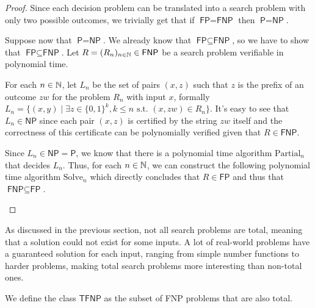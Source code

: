 \begin{proof}
 Since each decision problem can be translated into a search problem with only two possible outcomes, we trivially get that if $\textsf{FP} = \textsf{FNP}$ then $\textsf{P} = \textsf{NP}$.
    
 Suppose now that $\textsf{P} = \textsf{NP}$. We already know that $\textsf{FP} \subseteq \textsf{FNP}$, so we have to show that $\textsf{FP} \subseteq \textsf{FNP}$. Let $R = (R_n)_{n \in \mathbb{N}} \in \textsf{FNP}$ be a search problem verifiable in polynomial time.
    
 For each $n \in \mathbb{N}$, let $L_n$ be the set of pairs $(x,z)$ such that $z$ is the prefix of an outcome $zw$ for the problem $R_n$ with input $x$, formally $L_n = \{(x,y) \mid \exists z \in \{0,1\}^{k}, k \leq n \text{ s.t. } (x,zw) \in R_n\}$. It's easy to see that $L_n \in \textsf{NP}$ since each pair $(x,z)$ is certified by the string $zw$ itself and the correctness of this certificate can be polynomially verified given that $R \in \textsf{FNP}$.
    
 Since $L_n \in \textsf{NP} = \textsf{P}$, we know that there is a polynomial time algorithm $\mathrm{Partial}_n$ that decides $L_n$. Thus, for each $n \in \mathbb{N}$, we can construct the following polynomial time algorithm $\mathrm{Solve}_n$ which directly concludes that $R \in \textsf{FP}$ and thus that $\textsf{FNP} \subseteq \textsf{FP}$.

    \begin{algorithmic}
                \Else
                \EndIf
            \EndWhile
        \EndFunction
    \end{algorithmic}
\end{proof}

\newpage

As discussed in the previous section, not all search problems are total, meaning that a solution could not exist for some inputs. A lot of real-world problems have a guaranteed solution for each input, ranging from simple number functions to harder problems, making total search problems more interesting than non-total ones.

\begin{definition}
 We define the class $\mathsf{TFNP}$ as the subset of \textsf{FNP} problems that are also total.
\end{definition}

